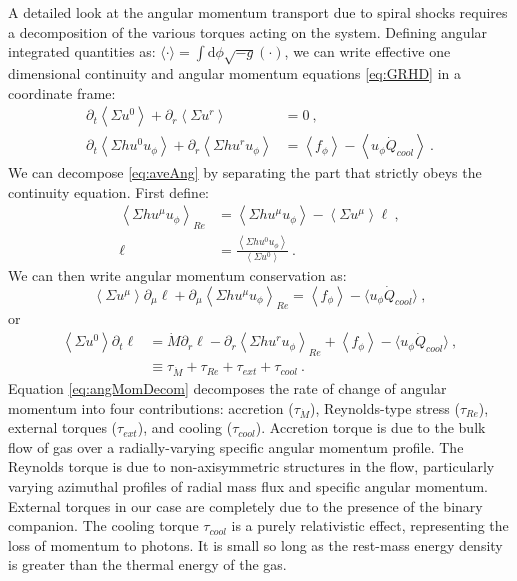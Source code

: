\documentclass{emulateapj}
\newcommand{\Sig}{\Sigma}
\newcommand{\dd}{\mbox{d}}
\newcommand{\ave}[1]{\left \langle #1 \right \rangle}
\newcommand{\avet}[1]{ \langle #1 \rangle}
\newcommand{\aveRe}[1]{\left \langle #1 \right \rangle_{Re}}
\begin{document}
A detailed look at the angular momentum transport due to spiral shocks requires a decomposition of the various torques acting on the system. Defining angular integrated quantities as: $\avet{\cdot} = \int \dd \phi \sqrt{-g} (\cdot)$, we can write effective one dimensional continuity and angular momentum equations \eqref{eq:GRHD} in a coordinate frame:
\begin{align}
	\partial_t \ave{\Sig u^0} + \partial_r \ave{\Sig u^r} &= 0 \ ,\label{eq:aveAng}\\
	\partial_t \ave{\Sig h u^0 u_\phi} + \partial_r \ave{\Sig h u^r u_\phi} &= \ave{f_\phi}- \ave{u_\phi \dot{Q}_{cool}} \ .\nonumber
\end{align} 
We can decompose \eqref{eq:aveAng} by separating the part that strictly obeys the continuity equation.  First define:
\begin{align*}
	\aveRe{\Sig h u^\mu u_\phi} &= \ave{\Sig h u^\mu u_\phi} - \ave{\Sig u^\mu} \ell \ , \\
	\ell &= \frac{\ave{\Sig h u^0 u_\phi}}{\ave{\Sig u^0} } \ .
\end{align*}
We can then write angular momentum conservation as:
\begin{equation}
	\ave{\Sig u^\mu} \partial_\mu \ell + \partial_\mu \aveRe{\Sig h u^\mu u_\phi} =  \ave{f_\phi}- \langle u_\phi \dot{Q}_{cool} \rangle \ , 
\end{equation}
or
\begin{align}
	\ave{\Sig u^0} \partial_t \ell &= \dot{M} \partial_r \ell -  \partial_r \aveRe{\Sig h u^r u_\phi} +  \ave{f_\phi}- \langle u_\phi \dot{Q}_{cool} \rangle \ , \nonumber \\
	&\equiv \tau_{\dot{M}} + \tau_{Re} + \tau_{ext} + \tau_{cool} \ . \label{eq:angMomDecom}
\end{align} 
Equation \eqref{eq:angMomDecom} decomposes the rate of change of angular momentum into four contributions: accretion ($\tau_{\dot{M}}$), Reynolds-type stress ($\tau_{Re}$), external torques ($\tau_{ext}$), and cooling ($\tau_{cool}$).  Accretion torque is due to the bulk flow of gas over a radially-varying specific angular momentum profile. The Reynolds torque is due to non-axisymmetric structures in the flow, particularly varying azimuthal profiles of radial mass flux and specific angular momentum. External torques in our case are completely due to the presence of the binary companion. The cooling torque $\tau_{cool}$ is a purely relativistic effect, representing the loss of momentum to photons. It is small so long as the rest-mass energy density is greater than the thermal energy of the gas.
\end{document}
